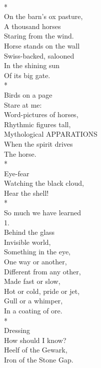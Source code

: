 \documentclass[smalldemyvopaper,11pt,twoside,onecolumn,openright,extrafontsizes]{memoir}
\begin{document}
\\*
\\On the barn's ox pasture,
\\A thousand horses
\\Staring from the wind.
\\Horse stands on the wall
\\Swiss-backed, salooned
\\In the shining sun
\\Of its big gate.
\\*
\\Birds on a page
\\Stare at me:
\\Word-pictures of horses,
\\Rhythmic figures tall,
\\Mythological APPARATIONS
\\When the spirit drives
\\The horse.
\\*
\\Eye-fear
\\Watching the black cloud,
\\Hear the shell!
\\*
\\So much we have learned
\\1.
\\Behind the glass
\\Invisible world,
\\Something in the eye,
\\One way or another,
\\Different from any other,
\\Made fast or slow,
\\Hot or cold, pride or jet,
\\Gull or a whimper,
\\In a coating of ore.
\\*
\\Dressing
\\How should I know?
\\Heelf of the Gewark,
\\Iron of the Stone Gap.
\end{document}
